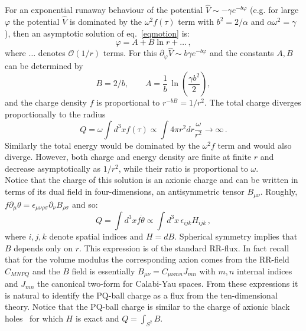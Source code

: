 \documentclass[11pt,a4paper]{article}
\newcommand{\be}{\begin{equation}}
\newcommand{\ee}{\end{equation}}
\begin{document}
For an exponential runaway behaviour of the potential $\hat{V}\sim  -\gamma e^{-b\varphi}$ (e.g. for large $\varphi$ the potential $\hat{V}$ is dominated by the $\omega^2 f(\tau)$ term with $b^2=2/\alpha$ and $\alpha\omega^2=\gamma$ ), then an asymptotic solution of eq.~\eqref{eqmotion} is:
\be
\varphi=A+B\ln r + \dots \,,
\ee
where $\dots$ denotes $\mathcal{O} (1/r)$ terms. For this $\partial_\varphi \hat{V} \sim  b\gamma e^{-b\varphi}$ and the constants $A,B$ can be determined by 
\be
B=2/b, \qquad A=\frac{1}{b}\,\ln\left(\frac{\gamma b^2}{2}\right),
\ee
and the charge density $f$ is proportional to $r^{-bB}=1/r^2$.  The total charge diverges proportionally to the radius
\be
Q=\omega\int d^3x f(\tau) \propto  \int 4\pi r^2 dr \frac{\omega}{r^2}\to\infty \,.
\ee
Similarly the total energy would be dominated  by the $\omega^2 f$ term and would also diverge. However, both charge and energy density are finite at finite $r$ and decrease asymptotically as $1/r^2$, while their ratio is proportional to $\omega$.\\

Notice that the charge of this solution is an axionic charge and can be written in terms of its dual field in four-dimensions, an antisymmetric tensor $B_{\mu\nu}$. Roughly, $f\partial_\mu\theta=\epsilon_{\mu\nu\rho\sigma}\partial_{\nu} B_{\rho\sigma}$ and so:
\be
Q=\int d^3x f\dot{\theta}\propto \int d^3x\, \epsilon_{ijk}H_{ijk} \,,
\ee
where $i,j,k$ denote spatial indices and $H=dB.$ Spherical symmetry implies that $B$ depends only on $r$. This expression is of the standard RR-flux. In fact recall that for the volume modulus the corresponding axion comes from the RR-field $C_{MNPQ}$ and the $B$ field is essentially $B_{\mu\nu}=C_{\mu\nu mn} J_{mn}$ with $m,n$ internal indices and $J_{mn}$ the canonical two-form for Calabi-Yau spaces. From these expressions it is natural to identify the PQ-ball charge as a flux from the ten-dimensional theory. Notice that the PQ-ball charge is similar to the  charge of axionic black holes~\cite{Bowick:1988xh} for which $H$ is exact and $Q=\int_{S^2} B$.\\
\end{document}

